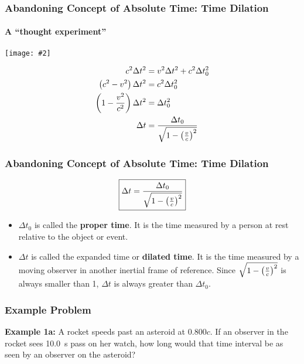\documentclass[12pt,compress,aspectratio=169]{beamer}
\newcommand{\pic}[2]{\texttt{[image: \#2]}}
\newcommand{\bigsqrt}{\ensuremath\sqrt{1-\left(\frac{v}{c}\right)^2}}
\begin{document}
\begin{frame}
  \frametitle{Abandoning Concept of Absolute Time: Time Dilation}
  \framesubtitle{A ``thought experiment''}
  \begin{center}
    \pic{.7}{graphics/dilation.png}
  \end{center}
  \begin{align*}
    c^2\Delta t^2 &=v^2\Delta t^2 + c^2\Delta t_0^2\\
    \left(c^2-v^2\right)\Delta t^2 &=c^2\Delta t_0^2\\
    \left(1-\frac{v^2}{c^2}\right)\Delta t^2 &=\Delta t_0^2\\
    \Delta t &=\frac{\Delta t_0}{\bigsqrt}
  \end{align*}
\end{frame}


\begin{frame}
  \frametitle{Abandoning Concept of Absolute Time: Time Dilation}
  {\Large
    \begin{displaymath}
      \boxed{\Delta t =\frac{\Delta t_0}{\bigsqrt}}
    \end{displaymath}
  }
  \begin{itemize}
  \item $\Delta t_0$ is called the \textbf{proper time}. It is the time measured
    by a person at rest relative to the object or event.
  \item $\Delta t$ is called the expanded time or \textbf{dilated time}. It is 
    the time measured by a moving observer in another inertial frame of
    reference. Since $\bigsqrt$ is always smaller than 1, $\Delta t$ is always
    greater than $\Delta t_0$.
  \end{itemize}
\end{frame}

\begin{frame}
  \frametitle{Example Problem}
  \textbf{Example 1a:} A rocket speeds past an asteroid at $0.800c$. If an
  observer in the rocket sees \SI{10.0}{s} pass on her watch, how long would
  that time interval be as seen by an observer on the asteroid?



\end{frame}
\end{document}
